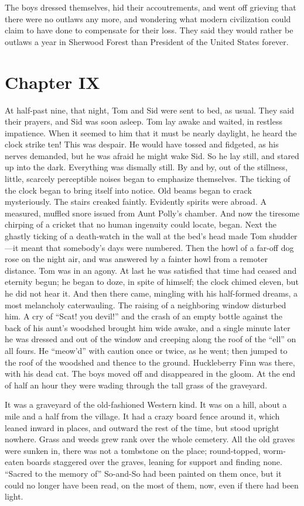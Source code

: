 \documentclass{book}
\begin{document}
The boys dressed themselves, hid their accoutrements, and went off grieving that there were no outlaws any more, and wondering what modern civilization could claim to have done to compensate for their loss. They said they would rather be outlaws a year in Sherwood Forest than President of the United States forever.

\chapter*{Chapter IX}

At half-past nine, that night, Tom and Sid were sent to bed, as usual. They said their prayers, and Sid was soon asleep. Tom lay awake and waited, in restless impatience. When it seemed to him that it must be nearly daylight, he heard the clock strike ten! This was despair. He would have tossed and fidgeted, as his nerves demanded, but he was afraid he might wake Sid. So he lay still, and stared up into the dark. Everything was dismally still. By and by, out of the stillness, little, scarcely perceptible noises began to emphasize themselves. The ticking of the clock began to bring itself into notice. Old beams began to crack mysteriously. The stairs creaked faintly. Evidently spirits were abroad. A measured, muffled snore issued from Aunt Polly’s chamber. And now the tiresome chirping of a cricket that no human ingenuity could locate, began. Next the ghastly ticking of a death-watch in the wall at the bed’s head made Tom shudder—it meant that somebody’s days were numbered. Then the howl of a far-off dog rose on the night air, and was answered by a fainter howl from a remoter distance. Tom was in an agony. At last he was satisfied that time had ceased and eternity begun; he began to doze, in spite of himself; the clock chimed eleven, but he did not hear it. And then there came, mingling with his half-formed dreams, a most melancholy caterwauling. The raising of a neighboring window disturbed him. A cry of “Scat! you devil!” and the crash of an empty bottle against the back of his aunt’s woodshed brought him wide awake, and a single minute later he was dressed and out of the window and creeping along the roof of the “ell” on all fours. He “meow’d” with caution once or twice, as he went; then jumped to the roof of the woodshed and thence to the ground. Huckleberry Finn was there, with his dead cat. The boys moved off and disappeared in the gloom. At the end of half an hour they were wading through the tall grass of the graveyard.

It was a graveyard of the old-fashioned Western kind. It was on a hill, about a mile and a half from the village. It had a crazy board fence around it, which leaned inward in places, and outward the rest of the time, but stood upright nowhere. Grass and weeds grew rank over the whole cemetery. All the old graves were sunken in, there was not a tombstone on the place; round-topped, worm-eaten boards staggered over the graves, leaning for support and finding none. “Sacred to the memory of” So-and-So had been painted on them once, but it could no longer have been read, on the most of them, now, even if there had been light.
\end{document}

